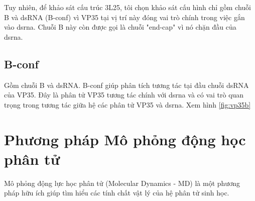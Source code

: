 \documentclass[12pt,a4paper,reqno, oneside]{book}
\begin{document}
		Tuy nhiên, để khảo sát cấu trúc 3L25, tôi chọn khảo sát cấu hình chỉ gồm chuỗi B và dsRNA (B-conf) vì VP35 tại vị trí này đóng vai trò chính trong việc gắn vào \gls{dsrna}\cite{Kimberlin2010}. Chuỗi B này còn được gọi là chuỗi "end-cap" vì nó chặn đầu của \gls{dsrna}\cite{Leung2010}.
%	

%	
%
		
	\subsection{B-conf}
	
		Gồm chuỗi B và dsRNA. B-conf giúp phân tích tương tác tại đầu chuỗi dsRNA của VP35. Đây là phân tử VP35 tương tác chính với \gls{dsrna} và có vai trò quan trọng trong tương tác giữa hệ các phân tử VP35 và \gls{dsrna}. Xem hình \ref{fig:vp35b}

\section{Phương pháp Mô phỏng động học phân tử}
Mô phỏng động lực học phân tử (Molecular Dynamics - MD) là một phương pháp hữu ích giúp tìm hiểu các tính chất vật lý của hệ phân tử sinh học.
\end{document}

